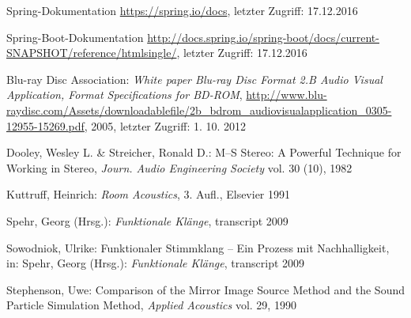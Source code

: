 \begin{thebibliography}{}


Spring-Dokumentation
\url{https://spring.io/docs}, letzter Zugriff: 17.12.2016

Spring-Boot-Dokumentation
\url{http://docs.spring.io/spring-boot/docs/current-SNAPSHOT/reference/htmlsingle/}, letzter Zugriff: 17.12.2016



Blu-ray Disc Association: 
\emph{White paper Blu-ray Disc Format 2.B Audio Visual Application, Format Specifications for BD-ROM}, 
\url{http://www.blu-raydisc.com/Assets/downloadablefile/2b_bdrom_audiovisualapplication_0305-12955-15269.pdf}, 2005, letzter Zugriff: 1. 10. 2012

Dooley, Wesley L.  \& Streicher, Ronald D.:
\glqq M--S Stereo: A Powerful Technique for Working in Stereo\grqq, 
\emph{Journ. Audio Engineering Society} vol. 30 (10), 1982

Kuttruff, Heinrich: 
\emph{Room Acoustics}, 3. Aufl., Elsevier 1991

Spehr, Georg (Hrsg.): 
\emph{Funktionale Klänge}, transcript 2009

Sowodniok, Ulrike: 
\glqq Funktionaler Stimmklang -- Ein Prozess mit Nachhalligkeit\grqq, 
in: Spehr, Georg (Hrsg.): \emph{Funktionale Klänge}, transcript 2009

Stephenson, Uwe: 
\glqq Comparison of the Mirror Image Source Method and the Sound Particle Simulation Method\grqq, 
\emph{Applied Acoustics} vol. 29, 1990


\end{thebibliography}

\clearpage\thispagestyle{empty}
\eigen  %












